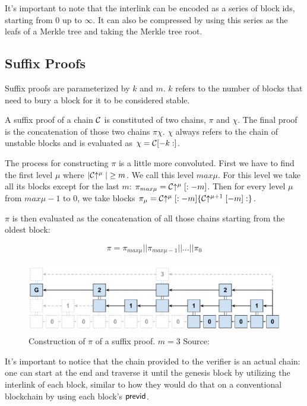 It's important to note that the interlink can be encoded as a series of block ids, starting from $0$ up to $\infty$. It can also be compressed by using this series as the leafs of a Merkle tree and taking the Merkle tree root.

\subsection{Suffix Proofs}
Suffix proofs are parameterized by $k$ and $m$. $k$ refers to the number of blocks that need to bury a block for it to be considered stable.

A suffix proof of a chain $\mathcal{C}$ is constituted of two chains, $\pi$ and $\chi$. The final proof is the concatenation of those two chains $\pi \chi$. $\chi$ always refers to the chain of unstable blocks and is evaluated as $\chi = \mathcal{C}[-k:]$.

The process for constructing $\pi$ is a little more convoluted. First we have to find the first level $\mu$ where $|\mathcal{C}\negthickspace\uparrow^\mu| \ge m$. We call this level $max\mu$. For this level we take all its blocks except for the last $m$: $\pi_{max\mu} = \mathcal{C}\negthickspace\uparrow^\mu[:-m]$. Then for every level $\mu$ from $max\mu - 1$ to $0$, we take blocks $\pi_\mu = \mathcal{C}\negthickspace\uparrow^\mu [:-m]\{\mathcal{C}\negthickspace\uparrow^{\mu+1}[-m]:\}$.

$\pi$ is then evaluated as the concatenation of all those chains starting from the oldest block:

$$ \pi = \pi_{max\mu} || \pi_{max\mu-1} || \ldots || \pi_0 $$

\begin{figure}
  \centering
  \includegraphics[width=0.9\columnwidth,keepaspectratio]{figures/non-interactive-popow.pdf}
  \caption{Construction of $\pi$ of a suffix proof. $m=3$  Source:~\cite{nipopows}}
  \label{fig:suffix-proof}
\end{figure}

It's important to notice that the chain provided to the verifier is an actual chain: one can start at the end and traverse it until the genesis block by utilizing the interlink of each block, similar to how they would do that on a conventional blockchain by using each block's $\sf previd$.

